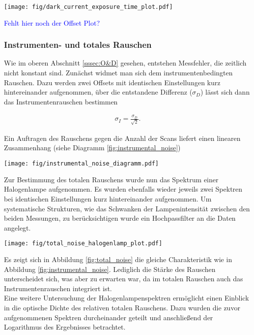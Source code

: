 \documentclass[12pt, a4paper, bibliography=totoc]{scrartcl}
\begin{document}
\begin{multicols}{2}
\begin{center}
	\texttt{[image: fig/dark\_current\_exposure\_time\_plot.pdf]}
	\label{fig:dark_current}
\end{center}
\textcolor{blue}{Fehlt hier noch der Offset Plot?}

\subsubsection{Instrumenten- und totales Rauschen}\label{sssec:instrumental_total_noise}

Wie im oberen Abschnitt \ref{sssec:O&D} gesehen, entstehen Messfehler, die zeitlich nicht konstant sind. Zunächst widmet man sich dem instrumentenbedingten Rauschen.
Dazu werden zwei Offsets mit identischen Einstellungen kurz hintereinander aufgenommen, über die entstandene Differenz ($\sigma_D$) lässt sich dann das Instrumentenrauschen bestimmen 

\begin{align}
\sigma_{I} = \frac{\sigma_D}{\sqrt{2}}.\label{eq:instrumental_noise}
\end{align}

Ein Auftragen des Rauschens gegen die Anzahl der Scans liefert einen linearen Zusammenhang (siehe Diagramm \ref{fig:instrumental_noise})

\begin{center}
	\texttt{[image: fig/instrumental\_noise\_diagramm.pdf]}
	\label{fig:instrumental_noise}
\end{center}  

Zur Bestimmung des totalen Rauschens wurde nun das Spektrum einer Halogenlampe aufgenommen.
Es wurden ebenfalls wieder jeweils zwei Spektren bei identischen Einstellungen kurz hintereinander aufgenommen. 
Um systematische Strukturen, wie das Schwanken der Lampenintensität zwischen den beiden Messungen, zu berücksichtigen wurde ein Hochpassfilter an die Daten angelegt.
\begin{center}
	\texttt{[image: fig/total\_noise\_halogenlamp\_plot.pdf]}
	\label{fig:total_noise}
\end{center}  

Es zeigt sich in Abbildung \ref{fig:total_noise} die gleiche Charakteristik wie in Abbildung \ref{fig:instrumental_noise}. Lediglich die Stärke des Rauschen unterscheidet sich, was aber zu erwarten war, da im totalen Rauschen auch das Instrumentenrauschen integriert ist.
\\
Eine weitere Untersuchung der Halogenlampenspektren ermöglicht einen Einblick in die optische Dichte des relativen totalen Rauschens. Dazu wurden die zuvor aufgenommenen Spektren durcheinander geteilt und anschließend der Logarithmus des Ergebnisses betrachtet.


\end{multicols}
\end{document}
